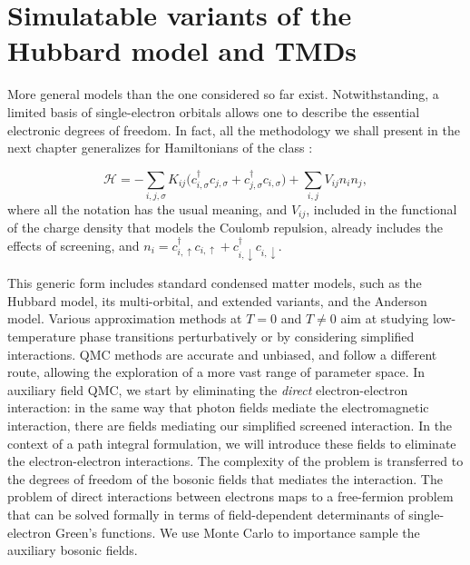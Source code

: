 \section{Simulatable variants of the Hubbard model and TMDs}\label{sec:variants}

More general  models than the one considered so far exist.
Notwithstanding, a limited basis of single-electron orbitals allows one to describe the essential electronic degrees of freedom.
In fact, all the methodology we shall present in the next chapter generalizes for Hamiltonians of the class \cite{hanke_electronic_nodate}:

\begin{equation}\label{eq:variantsForm}
\mathcal{H} = - \sum_{i, j, \sigma} K_{ij} \bigg( c_{i, \sigma}^\dagger c_{j, \sigma} + c_{j, \sigma}^\dagger c_{i, \sigma} \bigg) + \sum_{i, j} V_{ij} n_i n_j ,
\end{equation}
where all the notation has the usual meaning, and $V_{ij}$, included in the functional of the charge density that models the Coulomb repulsion, already includes the effects of screening, and $n_i = c_{i,\uparrow}^\dagger c_{i,\uparrow} + c_{i,\downarrow}^\dagger c_{i,\downarrow}$.

This generic form includes standard condensed matter models, such as the Hubbard model, its multi-orbital, and extended variants, and the Anderson model.
Various approximation methods at $T = 0$ and $T \neq 0$ aim at studying low-temperature phase transitions perturbatively or by considering simplified interactions.
\ac{QMC} methods are accurate and unbiased, and follow a different route, allowing the exploration of a more vast range of parameter space.
In auxiliary field \ac{QMC}, we start by eliminating the \emph{direct} electron-electron interaction: in the same way that photon fields mediate the electromagnetic interaction, there are fields mediating our simplified screened interaction.
In the context of a path integral formulation, we will introduce these fields to eliminate the electron-electron interactions.
The complexity of the problem is transferred to the degrees of freedom of the bosonic fields that mediates the interaction.
The problem of direct interactions between electrons maps to a free-fermion problem that can be solved formally in terms of field-dependent determinants of single-electron Green's functions.
We use Monte Carlo to importance sample the auxiliary bosonic fields.

